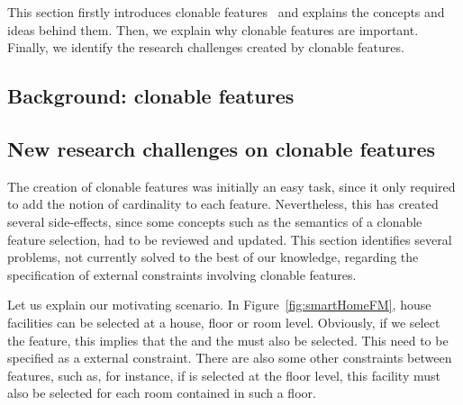 
This section firstly introduces clonable features~\cite{czarnecki:2005d,czarnecki:2005} and explains the concepts and ideas behind them. Then, we explain why clonable features are important. Finally, we identify the research challenges created by clonable features.

\subsection{Background: clonable features}



\subsection{New research challenges on clonable features}

The creation of clonable features was initially an easy task, since it only required to add the notion of cardinality to each feature. Nevertheless, this has created several side-effects, since some concepts such as the semantics of a clonable feature selection, had to be reviewed and updated. This section identifies several problems, not currently solved to the best of our knowledge, regarding the specification of external constraints involving clonable features.

Let us explain our motivating scenario. In Figure~\ref{fig:smartHomeFM}, house facilities can be selected at a house, floor or room level. Obviously, if we select the  feature, this implies that the  and the  must also be selected. This need to be specified as a external constraint. There are also some other constraints between features, such as, for instance, if  is selected at the floor level, this facility must also be selected for each room contained in such a floor. 


